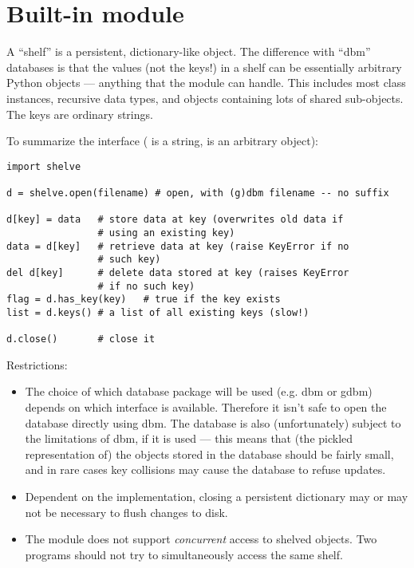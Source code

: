 \section{Built-in module }

A ``shelf'' is a persistent, dictionary-like object.  The difference
with ``dbm'' databases is that the values (not the keys!) in a shelf
can be essentially arbitrary Python objects --- anything that the
 module can handle.  This includes most class instances,
recursive data types, and objects containing lots of shared
sub-objects.  The keys are ordinary strings.

To summarize the interface ( is a string,  is an
arbitrary object):

\begin{verbatim}
import shelve

d = shelve.open(filename) # open, with (g)dbm filename -- no suffix

d[key] = data   # store data at key (overwrites old data if
                # using an existing key)
data = d[key]   # retrieve data at key (raise KeyError if no
                # such key)
del d[key]      # delete data stored at key (raises KeyError
                # if no such key)
flag = d.has_key(key)   # true if the key exists
list = d.keys() # a list of all existing keys (slow!)

d.close()       # close it
\end{verbatim}

Restrictions:

\begin{itemize}

\item
The choice of which database package will be used (e.g. dbm or gdbm)
depends on which interface is available.  Therefore it isn't safe to
open the database directly using dbm.  The database is also
(unfortunately) subject to the limitations of dbm, if it is used ---
this means that (the pickled representation of) the objects stored in
the database should be fairly small, and in rare cases key collisions
may cause the database to refuse updates.

\item
Dependent on the implementation, closing a persistent dictionary may
or may not be necessary to flush changes to disk.

\item
The  module does not support {\em concurrent} access to
shelved objects.  Two programs should not try to simultaneously access
the same shelf.

\end{itemize}
